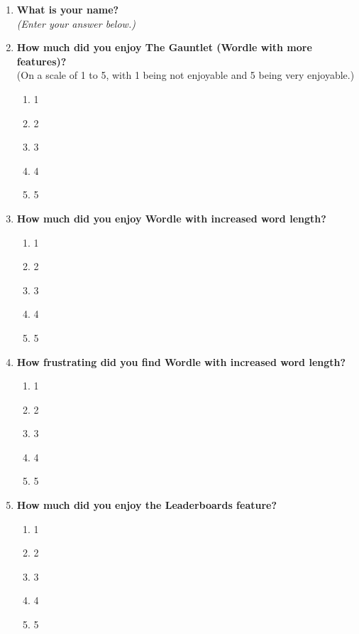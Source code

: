 \begin{enumerate}
    \item \textbf{What is your name?} \\
    \textit{(Enter your answer below.)}
    \vspace{2cm}
    \hrulefill
    
    \item \textbf{How much did you enjoy The Gauntlet (Wordle with more features)?} \\
    (On a scale of 1 to 5, with 1 being not enjoyable and 5 being very enjoyable.)
    \begin{enumerate}[label=(\arabic*)]
        \item 1
        \item 2
        \item 3
        \item 4
        \item 5
    \end{enumerate}

    \item \textbf{How much did you enjoy Wordle with increased word length?}
    \begin{enumerate}[label=(\arabic*)]
        \item 1
        \item 2
        \item 3
        \item 4
        \item 5
    \end{enumerate}

    \item \textbf{How frustrating did you find Wordle with increased word length?}
    \begin{enumerate}[label=(\arabic*)]
        \item 1
        \item 2
        \item 3
        \item 4
        \item 5
    \end{enumerate}

    \item \textbf{How much did you enjoy the Leaderboards feature?}
    \begin{enumerate}[label=(\arabic*)]
        \item 1
        \item 2
        \item 3
        \item 4
        \item 5
    \end{enumerate}


\end{enumerate}
